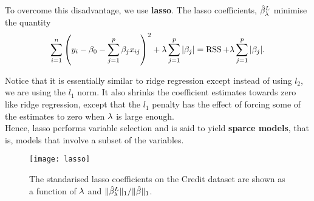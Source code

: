 \documentclass{report}
\newcommand{\gbh}{\hat{\gb}}
\DeclareMathOperator{\RSS}{RSS}
\begin{document}
	To overcome this disadvantage, we use \textbf{lasso}. The lasso coefficients, $\gbh_{\lm}^L$ minimise the quantity
	$$\sum_{i=1}^{n}\lt(y_i-\gb_0-\sum_{j=1}^{p}\gb_jx_{ij}\rt)^2+\lm\sum_{j=1}^{p}|\gb_j|=\RSS+\lm\sum_{j=1}^{p}|\gb_j|.$$
	
	Notice that it is essentially similar to ridge regression except instead of using $l_2$, we are using the $l_1$ norm. It also shrinks the coefficient estimates towards zero like ridge regression, except that the $l_1$ penalty has the effect of forcing some of the estimates to zero when $\lambda$ is large enough. \\
	
	Hence, lasso performs variable selection and is said to yield \textbf{sparce models}, that is, models that involve a subset of the variables.\\
	\pagebreak
	\begin{figure}[h]
		\centering
		\texttt{[image: lasso]}
		\caption{The standarised lasso coefficients on the Credit dataset are shown as a function of $\lambda$ and $\|\gbh_{\lm}^L\|_1/\|\gbh\|_1$.}
		\label{fig:lasso}
	\end{figure}
	
	\pagebreak
	
\end{document}

